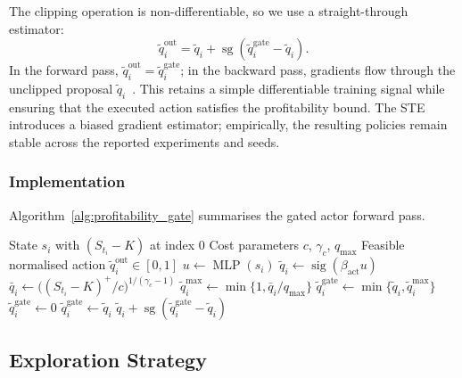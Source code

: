 \documentclass[a4paper,fleqn]{cas-dc}
\DeclareMathOperator{\sg}{sg}
\begin{document}
The clipping operation is non-differentiable, so we use a straight-through estimator:
\[
    \tilde{q}_i^{\mathrm{out}}
    =
    \tilde{q}_i + \sg\!\left(\tilde{q}_i^{\mathrm{gate}} - \tilde{q}_i\right).
\]
In the forward pass, $\tilde{q}_i^{\mathrm{out}} = \tilde{q}_i^{\mathrm{gate}}$; in the backward pass, gradients flow through the unclipped proposal $\tilde{q}_i$~\cite{bengio2013ste}. This retains a simple differentiable training signal while ensuring that the executed action satisfies the profitability bound. The STE introduces a biased gradient estimator; empirically, the resulting policies remain stable across the reported experiments and seeds.

\subsubsection{Implementation}

Algorithm~\ref{alg:profitability_gate} summarises the gated actor forward pass.

\begin{algorithm}[htbp]
    \caption{Profitability-gated actor forward pass}
    \label{alg:profitability_gate}
    \begin{algorithmic}[1]
        \Require State $s_i$ with $(S_{t_i} - K)$ at index $0$
        \Require Cost parameters $c$, $\gamma_c$, $q_{\max}$
        \Ensure Feasible normalised action $\tilde{q}_i^{\mathrm{out}} \in [0,1]$
        \State $u \gets \operatorname{MLP}(s_i)$
        \State $\tilde{q}_i \gets \operatorname{sig}(\beta_{\mathrm{act}} u)$ 
        \State $\bar{q}_i \gets \bigl((S_{t_i}-K)^+/c\bigr)^{1/(\gamma_c-1)}$
        \State $\tilde{q}_i^{\max} \gets \min\{1,\bar{q}_i/q_{\max}\}$
        \State $\tilde{q}_i^{\mathrm{gate}} \gets \min\{\tilde{q}_i,\tilde{q}_i^{\max}\}$
        \State $\tilde{q}_i^{\mathrm{gate}} \gets 0$
        \Else
        \State $\tilde{q}_i^{\mathrm{gate}} \gets \tilde{q}_i$
        \EndIf
        \State \Return $\tilde{q}_i + \sg(\tilde{q}_i^{\mathrm{gate}} - \tilde{q}_i)$
    \end{algorithmic}
\end{algorithm}

\subsection{Exploration Strategy}
\label{sec:exploration}
\end{document}
